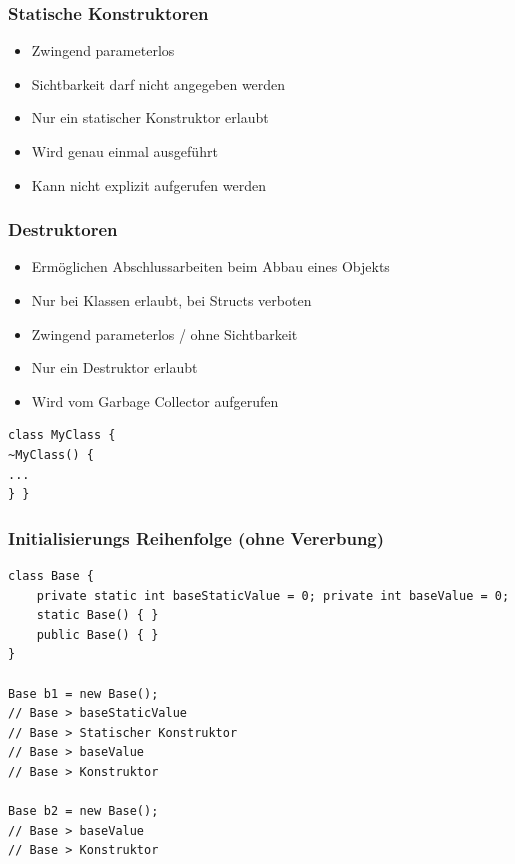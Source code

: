 \subsubsection{Statische Konstruktoren}
\begin{itemize}
    \item Zwingend parameterlos
    \item Sichtbarkeit darf nicht angegeben werden
    \item Nur ein statischer Konstruktor erlaubt
    \item Wird genau einmal ausgeführt
    \item Kann nicht explizit aufgerufen werden
\end{itemize}

\subsubsection{Destruktoren}
\begin{itemize}
    \item Ermöglichen Abschlussarbeiten beim Abbau eines Objekts
    \item Nur bei Klassen erlaubt, bei Structs verboten
    \item Zwingend parameterlos / ohne Sichtbarkeit
    \item Nur ein Destruktor erlaubt
    \item Wird vom Garbage Collector aufgerufen
\end{itemize}

\begin{lstlisting}
class MyClass {
~MyClass() {
...
} }
\end{lstlisting}


\subsubsection{Initialisierungs Reihenfolge (ohne Vererbung)}
\begin{lstlisting}
class Base {
    private static int baseStaticValue = 0; private int baseValue = 0;
    static Base() { }
    public Base() { }
}

Base b1 = new Base();
// Base > baseStaticValue
// Base > Statischer Konstruktor
// Base > baseValue
// Base > Konstruktor

Base b2 = new Base();
// Base > baseValue
// Base > Konstruktor
\end{lstlisting}
